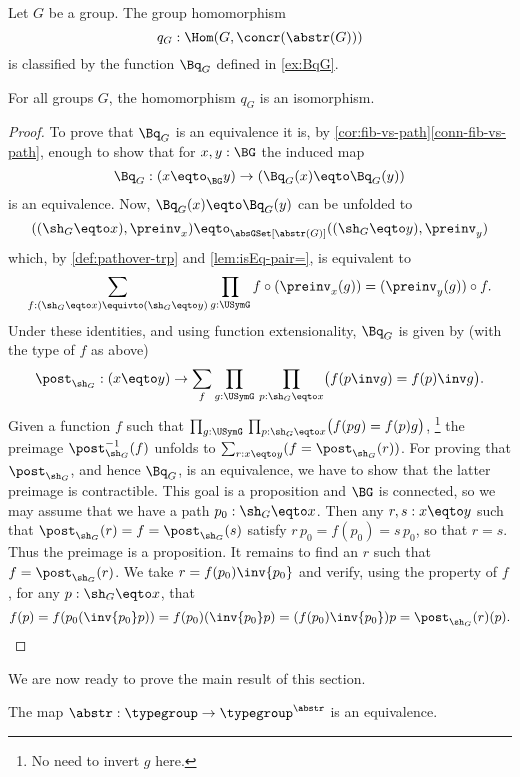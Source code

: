 \begin{definition}\label{def:qG-concr-abstr}
  Let $G$ be a group.
  The group homomorphism
  $$q_G:\Hom(G,\concr(\abstr(G)))$$
  is classified by the function $\Bq_G$ defined in \cref{ex:BqG}.
\end{definition}

\begin{lemma}
  \label{lem:Groupsareidentitytypes}
For all groups $G$, the homomorphism $q_G$ is an isomorphism.
\end{lemma}
\begin{proof}
  To prove that $\Bq_G$ is an equivalence it is, by \cref{cor:fib-vs-path}\ref{conn-fib-vs-path}, enough to show that for $x,y:\BG$ the induced map
$$\Bq_G:(x\eqto_{\BG}y)\to (\Bq_G(x)\eqto \Bq_G(y))
$$
is an equivalence.
  Now, $\Bq_G(x)\eqto \Bq_G(y)$ can be unfolded to
$$
((\sh_G\eqto x),\preinv_x)\eqto_{\absGSet[\abstr(G)]}((\sh_G\eqto y),\preinv_y)$$
which, by \cref{def:pathover-trp} and \cref{lem:isEq-pair=}, is equivalent to
\[
\sum_{f:(\sh_G\eqto x)\equivto (\sh_G\eqto y)}
\prod_{g:\USymG} f\circ(\preinv_x(g))=(\preinv_y(g))\circ f.
\]
Under these identities, and using function extensionality,
$\Bq_G$ is given by (with the type of $f$ as above)
\[
\post_{\sh_G}:(x\eqto y)\to \sum_{f}
\prod_{g:\USymG}\,\prod_{p:\sh_G\eqto x}\bigl(f(p\inv g)= f(p)\inv g\bigr).
\]
Given a function $f$ such that
$\prod_{g:\USymG}\,\prod_{p:\sh_G\eqto x}\bigl(f(pg)= f(p)g\bigr)$,%
\footnote{No need to invert $g$ here.}
the preimage $\post_{\sh_G}^{-1}(f)$ unfolds to
$\sum_{r:x\eqto y}(f=\post_{\sh_G}(r))$. For proving that $\post_{\sh_G}$,
and hence $\Bq_G$, is an equivalence, we have to show that the
latter preimage is contractible. This goal is a proposition
and $\BG$ is connected, so we may assume that we have a 
path $p_0:\sh_G\eqto x$. Then any $r,s:x\eqto y$ such that
$\post_{\sh_G}(r)= f=\post_{\sh_G}(s)$ satisfy $r\,p_0=f(p_0)=s\,p_0$,
so that $r=s$. Thus the preimage is a proposition. It remains
to find an $r$ such that $f=\post_{\sh_G}(r)$. 
We take $r=f(p_0)\inv{p_0}$ and verify, using
the property of $f$, for any $p:\sh_G\eqto x$, that
\[
f(p) = f(p_0(\inv{p_0}p)) = f(p_0)(\inv{p_0} p) = (f(p_0) \inv{p_0}) p
= \post_{\sh_G}(r)(p).\qedhere
\]
\end{proof}

We are now ready to prove the main result of this section.

\begin{theorem}\label{thm:Groupsareidentitytypes}
The map ${\abstr}:\typegroup\to\typegroup^{\abstr}$ is an equivalence.
\end{theorem}

